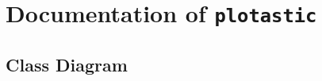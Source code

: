 




\section{Documentation of \texttt{plotastic}}



\def\mytitle{Class Diagram}
\subsection{\mytitle}

\def\umlconvention{Arrow shapes follow the UML (unified modeling
    language): A hollow triangle indicates inheritance (\textit{``is~a''}) and a
    filled diamond indicates composition (\textit{``has~a''}). }


